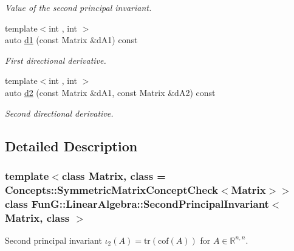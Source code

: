 \begin{DoxyCompactItemize}
\begin{DoxyCompactList}\small\item\em Value of the second principal invariant. \end{DoxyCompactList}\item 
{\footnotesize template$<$int , int $>$ }\\auto \hyperlink{classFunG_1_1LinearAlgebra_1_1SecondPrincipalInvariant_ad93b2fdd0ec9d05bd2024e93899c879c}{d1} (const Matrix \&d\-A1) const 
\begin{DoxyCompactList}\small\item\em First directional derivative. \end{DoxyCompactList}\item 
{\footnotesize template$<$int , int $>$ }\\auto \hyperlink{classFunG_1_1LinearAlgebra_1_1SecondPrincipalInvariant_ab167b423b1e1aa04971cf50494519227}{d2} (const Matrix \&d\-A1, const Matrix \&d\-A2) const 
\begin{DoxyCompactList}\small\item\em Second directional derivative. \end{DoxyCompactList}\end{DoxyCompactItemize}


\subsection{Detailed Description}
\subsubsection*{template$<$class Matrix, class = Concepts\-::\-Symmetric\-Matrix\-Concept\-Check$<$\-Matrix$>$$>$class Fun\-G\-::\-Linear\-Algebra\-::\-Second\-Principal\-Invariant$<$ Matrix, class $>$}

Second principal invariant $ \iota_2(A)=\mathrm{tr}(\mathrm{cof}(A)) $ for $A\in\mathbb{R}^{n,n}$. 

